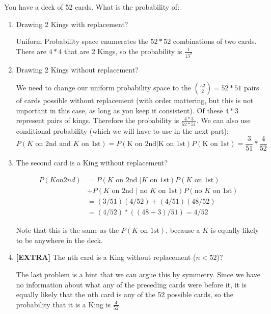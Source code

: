\question You have a deck of 52 cards. What is the probability of:
\begin{enumerate}[label=(\alph*)]

\item Drawing 2 Kings with replacement?
\begin{solution}[2 cm]
Uniform Probability space enumerates the $52*52$ combinations of two 
cards. There are $4*4$ that are 2 Kings, so the probability is 
$\frac{1}{13^2}$
 \end{solution}
 
\item Drawing 2 Kings without replacement?
\begin{solution}[2 cm]
We need to change our uniform probability space to the ${52 \choose 2} = 
52*51$ pairs of cards possible without replacement (with order 
mattering, but this is not important in this case, as long as you keep 
it consistent). Of these $4*3$ represent pairs of kings. Therefore the 
probability is $\frac{4*3}{52*51}$.
We can also use conditional probability (which we will have to use in 
the next part):
\[P(K \text{ on 2nd and } K \text{ on 1st}) = P(\text{K on 2nd} | 
\text{K on 1st}) P(\text{K on 1st}) = \frac{3}{51}*\frac{4}{52}\]
 \end{solution}
 
\item The second card is a King without replacement?
\vspace{2 cm}
\begin{solution}
\begin{equation}
\begin{split}
P(K on 2nd) &= P(K \text{ on 2nd }| K \text{ on 1st}) P(K \text{ on 1st}) \\
& + P(K \text{ on 2nd }| \text{ no $K$ on 1st}) P(\text{no $K$ on 1st}) \\
&= (3/51)(4/52) + (4/51)(48/52) \\
&= (4/52)*((48+3)/51) = 4/52
\end{split}
\end{equation}

Note that this is the same as the $P(K\text{ on 1st})$, because a $K$ 
is equally likely to be anywhere in the deck.
 \end{solution}
 
\item \textbf{[EXTRA]} The nth card is a King without replacement ($n < 52$)?
\vspace{2cm}
\begin{solution}
The last problem is a hint that we can argue this by symmetry. Since 
we have no information about what any of the preceding cards were 
before it, it is equally likely that the $n$th card is any of the 52 
possible cards, so the probability that it is a King is 
$\frac{4}{52}$.
\end{solution}

\end{enumerate}